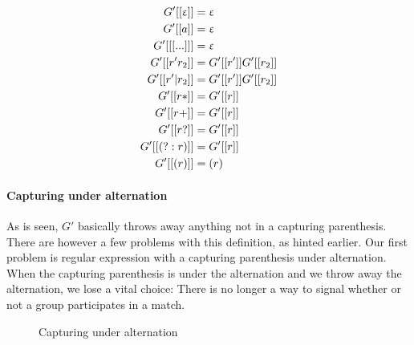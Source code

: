 \begin{align}
  G'[[\upvarepsilon]] &= \upvarepsilon \notag\\
  G'[[a]] &= \upvarepsilon \notag\\
  G'[[ [...] ]] &= \upvarepsilon \notag\\
  G'[[r'r_2]] &= G'[[r']]G'[[r_2]] \notag\\
  G'[[r'|r_2]] &= G'[[r']]G'[[r_2]] \notag\\
  G'[[r*]] &= G'[[r]] \notag\\
  G'[[r+]] &= G'[[r]] \notag\\
  G'[[r?]] &= G'[[r]] \notag\\
  G'[[(?:r)]] &= G'[[r]] \label{eq:G1_paren}\\
  G'[[(r)]] &= (r) \notag
\end{align}

\paragraph{Capturing under alternation}
As is seen, $G'$ basically throws away anything not in a capturing
parenthesis. There are however a few problems with this definition, as
hinted earlier. Our first problem is regular expression with a
capturing parenthesis under alternation. When the capturing
parenthesis is under the alternation and we throw away the
alternation, we lose a vital choice: There is no longer a way to
signal whether or not a group participates in a match.
\begin{figure}
  \centering
\caption{Capturing under alternation}
\end{figure}


